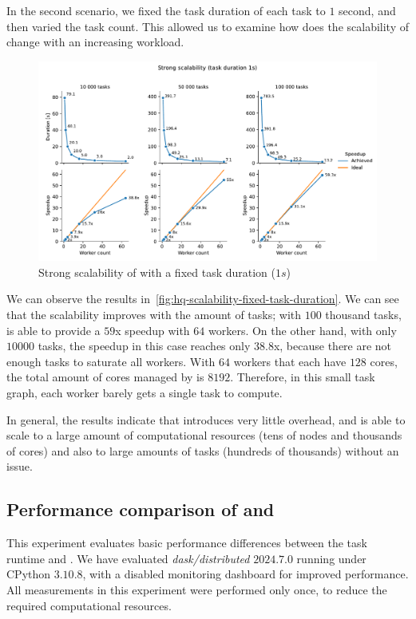 In the second scenario, we fixed the task duration of each task to $1$ second,
and then varied the task count. This allowed us to examine how does the scalability of
\hyperqueue{} change with an increasing workload.

\begin{figure}[h]
	\centering
	\includegraphics[width=\textwidth]{imgs/hq/charts/scalability-fixed-task-duration}
	\caption{Strong scalability of \hyperqueue{} with a fixed task duration ($1s$)}
	\label{fig:hq-scalability-fixed-task-duration}
\end{figure}

We can observe the results in~\autoref{fig:hq-scalability-fixed-task-duration}. We can see that the scalability improves
with the amount of tasks; with $100$ thousand tasks, \hyperqueue{} is
able to provide a $59$x speedup with $64$ workers. On the other
hand, with only $10000$ tasks, the speedup in this case reaches only
$38.8$x, because there are not enough tasks to saturate all workers. With
$64$ workers that each have $128$ cores, the total amount of
cores managed by \hq{} is $8192$. Therefore, in this small task
graph, each worker barely gets a single task to compute.

In general, the results indicate that \hyperqueue{} introduces very little overhead, and
is able to scale to a large amount of computational resources (tens of nodes and thousands of
cores) and also to large amounts of tasks (hundreds of thousands) without an issue.

\subsection{Performance comparison of \dask{} and \hq{}}
\label{sec:hq-exp-dask}
This experiment evaluates basic performance differences between the \dask{} task
runtime and \hyperqueue{}. We have evaluated \emph{dask/distributed}
$2024.7.0$ running under CPython $3.10.8$, with a disabled monitoring
dashboard for improved performance. All measurements in this experiment were performed only once,
to reduce the required computational resources.


